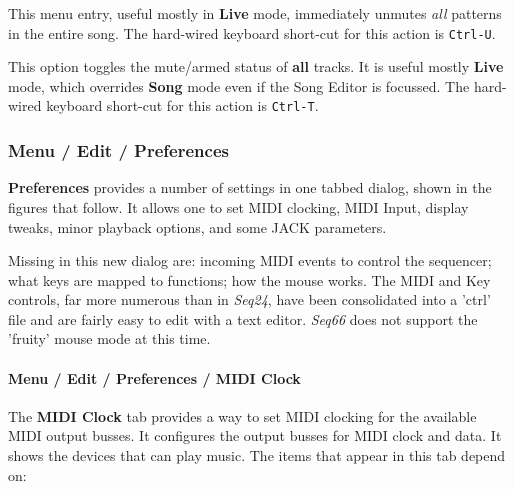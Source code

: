    This menu entry, useful mostly in \textbf{Live} mode,
   immediately unmutes \textsl{all} patterns in the entire song.
   The hard-wired keyboard short-cut for this action is \texttt{Ctrl-U}.

   This option toggles the mute/armed status of \textbf{all} tracks.
   It is useful mostly \textbf{Live} mode, which overrides \textbf{Song}
   mode even if the Song Editor is focussed.
   The hard-wired keyboard short-cut for this action is \texttt{Ctrl-T}.


\subsubsection{Menu / Edit / Preferences}
\label{subsubsec:menu_edit_preferences}

   \textbf{Preferences} provides a number of settings in one
   tabbed dialog, shown in the figures that follow.
   It allows one to set MIDI clocking, MIDI Input, display tweaks, minor
   playback options, and some JACK parameters.

   Missing in this new dialog are:
      incoming MIDI events to control the sequencer;
      what keys are mapped to functions;
      how the mouse works.
   The MIDI and Key controls, far more numerous than in \textsl{Seq24}, have
   been consolidated into a 'ctrl' file and are fairly easy to edit with a text
   editor.
   \textsl{Seq66} does not support the 'fruity' mouse mode at this time.

\paragraph{Menu / Edit / Preferences / MIDI Clock}
\label{paragraph:menu_edit_preferences_midi_clock}

   The \textbf{MIDI Clock} tab provides a way to set MIDI clocking for
   the available MIDI output busses.
   It configures the output busses for MIDI clock and data.
   It shows the devices that can play music.
   The items that appear in this tab depend on:

